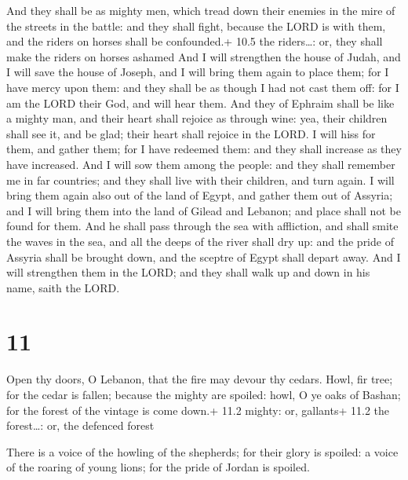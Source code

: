 And they shall be as mighty men, which tread down their
enemies in the mire of the streets in the battle: and they shall fight,
because the LORD is with them, and the riders on horses shall be
confounded.+ 10.5 the riders\ldots: or, they shall make the riders on
horses ashamed  And I will strengthen the house of Judah,
and I will save the house of Joseph, and I will bring them again to
place them; for I have mercy upon them: and they shall be as though I
had not cast them off: for I am the LORD their God, and will hear them.
 And they of Ephraim shall be like a mighty man, and their
heart shall rejoice as through wine: yea, their children shall see it,
and be glad; their heart shall rejoice in the LORD.  I will
hiss for them, and gather them; for I have redeemed them: and they shall
increase as they have increased.  And I will sow them among
the people: and they shall remember me in far countries; and they shall
live with their children, and turn again.  I will bring
them again also out of the land of Egypt, and gather them out of
Assyria; and I will bring them into the land of Gilead and Lebanon; and
place shall not be found for them.  And he shall pass
through the sea with affliction, and shall smite the waves in the sea,
and all the deeps of the river shall dry up: and the pride of Assyria
shall be brought down, and the sceptre of Egypt shall depart away.
 And I will strengthen them in the LORD; and they shall
walk up and down in his name, saith the LORD.

\hypertarget{section-10}{%
\section{11}\label{section-10}}

 Open thy doors, O Lebanon, that the fire may devour thy
cedars.  Howl, fir tree; for the cedar is fallen; because
the mighty are spoiled: howl, O ye oaks of Bashan; for the forest of the
vintage is come down.+ 11.2 mighty: or, gallants+ 11.2 the forest\ldots:
or, the defenced forest

 There is a voice of the howling of the shepherds; for
their glory is spoiled: a voice of the roaring of young lions; for the
pride of Jordan is spoiled.

